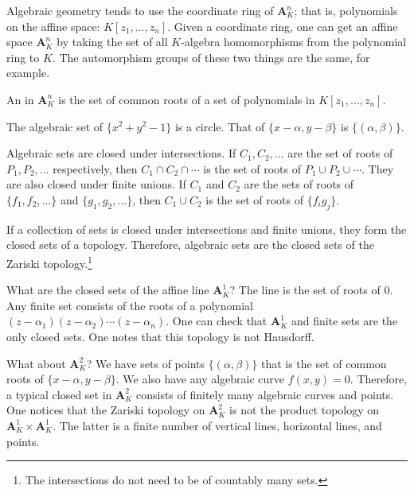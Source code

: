 \documentclass [11 pt, oneside] {article}
\begin{document}
Algebraic geometry tends to use the coordinate ring of $\mathbf{A}^n_K$; that is, polynomials on the affine space: $K[z_1,\hdots, z_n]$. Given a coordinate ring, one can get an affine space $\mathbf{A}^n_K$ by taking the set of all $K$-algebra homomorphisms from the polynomial ring to $K$. The automorphism groups of these two things are the same, for example.

\begin{definition}\label{}
An  in $\mathbf{A}^n_K$ is the set of common roots of a set of polynomials in $K[z_1,\hdots, z_n]$.
\end{definition}

\begin{example}[ ]\label{}
The algebraic set of $\{x^2+y^2-1\}$ is a circle. That of $\{x-\alpha,y-\beta\}$ is $\{(\alpha,\beta)\}$.
\end{example}

Algebraic sets are closed under intersections. If $C_1,C_2,\hdots $ are the set of roots of $P_1,P_2,\hdots$ respectively, then $C_1\cap C_2\cap \cdots $ is the set of roots of $P_1\cup P_2\cup \cdots$. They are also closed under finite unions. If $C_1$ and $C_2$ are the sets of roots of $\{f_1,f_2,\hdots\}$ and $\{g_1,g_2,\hdots\}$, then $C_1\cup C_2$ is the set of roots of $\{f_ig_j\}$.

If a collection of sets is closed under intersections and finite unions, they form the closed sets of a topology. Therefore, algebraic sets are the closed sets of the Zariski topology.\footnote{The intersections do not need to be of countably many sets.}

What are the closed sets of the affine line $\mathbf{A}^1_K$? The line is the set of roots of $0$. Any finite set consists of the roots of a polynomial $(z-\alpha_1)(z-\alpha_2)\cdots(z-\alpha_n)$. One can check that $\mathbf{A}^1_K$ and finite sets are the only closed sets. One notes that this topology is not Hausdorff.

What about $\mathbf{A}^2_K$? We have sets of points $\{(\alpha,\beta)\}$ that is the set of common roots of $\{x-\alpha, y-\beta\}$. We also have any algebraic curve $f(x,y) =0$. Therefore, a typical closed set in $\mathbf{A}^2_K$ consists of finitely many algebraic curves and points. One notices that the Zariski topology on $\mathbf{A}^2_K$ is not the product topology on $\mathbf{A}^1_K\times \mathbf{A}^1_K$. The latter is a finite number of vertical lines, horizontal lines, and points.
\end{document}
